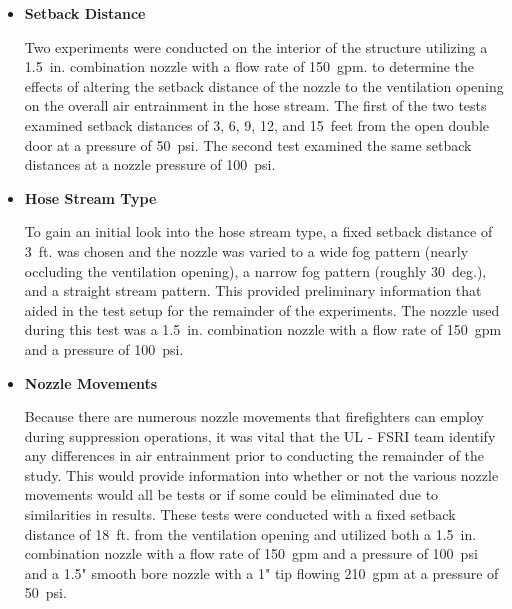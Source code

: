 \documentclass{article}
\begin{document}
\begin{itemize}

\item \bf{Setback Distance}
\normalfont
\vspace*{\baselineskip}

Two experiments were conducted on the interior of the structure utilizing a 1.5~in. combination nozzle with a flow rate of 150~gpm. to determine the effects of altering the setback distance of the nozzle to the ventilation opening on the overall air entrainment in the hose stream. The first of the two tests examined setback distances of 3, 6, 9, 12, and 15~feet from the open double door at a pressure of 50~psi. The second test examined the same setback distances at a nozzle pressure of 100~psi.  

\vspace*{\baselineskip}

\item \bf{Hose Stream Type}
\normalfont
\vspace*{\baselineskip}

To gain an initial look into the hose stream type, a fixed setback distance of 3~ft. was chosen and the nozzle was varied to a wide fog pattern (nearly occluding the ventilation opening), a narrow fog pattern (roughly 30~deg.), and a straight stream pattern. This provided preliminary information that aided in the test setup for the remainder of the experiments. The nozzle used during this test was a 1.5~in. combination nozzle with a flow rate of 150~gpm and a pressure of 100~psi.

\vspace*{\baselineskip}

\item \bf{Nozzle Movements}
\normalfont
\vspace*{\baselineskip}

Because there are numerous nozzle movements that firefighters can employ during suppression operations, it was vital that the UL - FSRI team identify any differences in air entrainment prior to conducting the remainder of the study. This would provide information into whether or not the various nozzle movements would all be tests or if some could be eliminated due to similarities in results. These tests were conducted with a fixed setback distance of 18~ft. from the ventilation opening and utilized both a 1.5~in. combination nozzle with a flow rate of 150~gpm and a pressure of 100~psi and a 1.5" smooth bore nozzle with a 1" tip flowing 210~gpm at a pressure of 50~psi.


\end{itemize}
\end{document}
